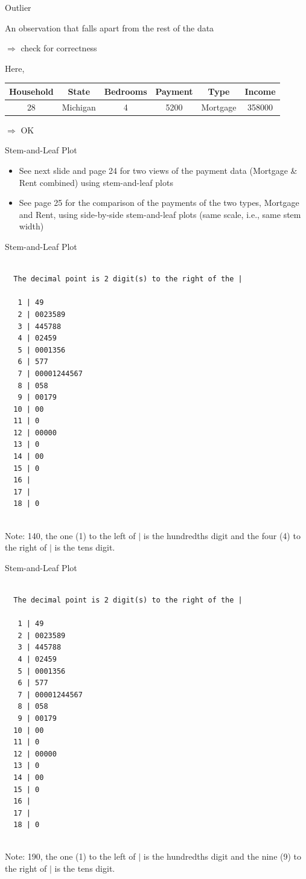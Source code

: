 \documentclass[14pt]{beamer}\usepackage[]{graphicx}\usepackage[]{color}
\begin{document}
\begin{frame}[fragile]{Outlier}

An observation that falls apart from the rest of the data

$\Rightarrow$ check for correctness  

Here,

{\small{
\begin{tabular}{@{} cccccc   @{}} \hline
Household & State & Bedrooms & Payment & Type & Income \\ \hline
28 & Michigan & 4 & 5200 & Mortgage & 358000 \\ \hline
\end{tabular}
}}

$\Rightarrow$ OK
\end{frame}

\begin{frame}[fragile]{Stem-and-Leaf Plot}

\begin{itemize}
\item See next slide and page 24 for two views of the payment data  (Mortgage \& Rent combined) using stem-and-leaf plots
\item See page 25 for the comparison of the payments of the two types,  Mortgage and Rent, using side-by-side stem-and-leaf plots (same  scale, i.e., same stem width)
\end{itemize}
\end{frame}

\begin{frame}[fragile]{Stem-and-Leaf Plot}

{\tiny{
\begin{verbatim}

  The decimal point is 2 digit(s) to the right of the |

   1 | 49
   2 | 0023589
   3 | 445788
   4 | 02459
   5 | 0001356
   6 | 577
   7 | 00001244567
   8 | 058
   9 | 00179
  10 | 00
  11 | 0
  12 | 00000
  13 | 0
  14 | 00
  15 | 0
  16 | 
  17 | 
  18 | 0


\end{verbatim}
}}

{\small{
Note: 140, the one (1) to the left of $|$ is the hundredths digit and the four (4) to the right of $|$ is the tens digit. }}  
\end{frame}

\begin{frame}[fragile]{Stem-and-Leaf Plot}

{\tiny{
\begin{verbatim}

  The decimal point is 2 digit(s) to the right of the |

   1 | 49
   2 | 0023589
   3 | 445788
   4 | 02459
   5 | 0001356
   6 | 577
   7 | 00001244567
   8 | 058
   9 | 00179
  10 | 00
  11 | 0
  12 | 00000
  13 | 0
  14 | 00
  15 | 0
  16 | 
  17 | 
  18 | 0


\end{verbatim}
}}

{\small{
Note: 190, the one (1) to the left of $|$ is the hundredths digit and the nine (9) to the right of $|$ is the tens digit. }}  
\end{frame}
\end{document}
